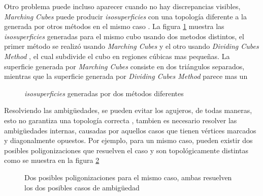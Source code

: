 Otro problema puede incluso aparecer cuando no hay discrepancias visibles, \emph{Marching Cubes} puede producir \emph{isosuperficies} con una topología diferente a la generada por otros métodos en el mismo caso \cite{Chernyaev95marchingcubes}. La figura \ref{f:estadoDelArte:Chernyaev95marchingcubes_2} muestra las \emph{isosuperficies} generadas para el mismo cubo usando dos metodos distintos, el primer método se realizó usando \emph{Marching Cubes} y el otro usando \emph{Dividing Cubes Method} \cite{Cline88twoalgorithms}, el cual subdivide el cubo en regiones cúbicas mas pequeñas. La superficie generada por \emph{Marching Cubes} consiste en dos triángulos separados, mientras que la superficie generada por \emph{Dividing Cubes Method} parece mas un 

\begin{figure}[tb]
\centering
\caption{\emph{isosuperficies} generadas por dos métodos diferentes \cite{Chernyaev95marchingcubes}}
\label{f:estadoDelArte:Chernyaev95marchingcubes_2}
\end{figure}

Resolviendo las ambigüedades, se pueden evitar los agujeros, de todas maneras, esto no garantiza una topología correcta \cite{Lewiner03efficientimplementation}, tambien es necesario resolver las ambigüedades internas, causadas por aquellos casos que tienen vértices marcados y diagonalmente opuestos. Por ejemplo, para un mismo caso, pueden existir dos posibles poligonizaciones que resuelven el caso y son topológicamente distintas como se muestra en la figura \ref{f:estadoDelArte:Lewiner03efficientimplementation_2}

\begin{figure}[!htb]
\centering
\caption{Dos posibles poligonizaciones para el mismo caso, ambas resuelven los dos posibles casos de ambigüedad \cite{Lewiner03efficientimplementation}}
\label{f:estadoDelArte:Lewiner03efficientimplementation_2}
\end{figure}

